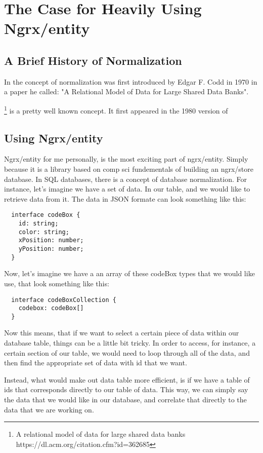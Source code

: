 \maketitle{}
\section{ The Case for Heavily Using Ngrx/entity }

\subsection{ A Brief History of Normalization}
In the concept of normalization was first introduced by Edgar F. Codd in 1970
in a paper he called: "A Relational Model of Data for Large Shared Data Banks".

\footnote{
A relational model of data for large shared data banks https://dl.acm.org/citation.cfm?id=362685}
is a pretty well known concept. It first
appeared in the 1980 version of

\subsection{Using Ngrx/entity}
Ngrx/entity for me personally, is the most exciting part of ngrx/entity. Simply
because it is a library based on comp sci fundementals of building an ngrx/store
database. In SQL databases, there is a concept of database normalization. For
instance, let's imagine we have a set of data. In our table, and we would like
to retrieve data from it. The data in JSON formate can look something like this:
\begin{lstlisting}
  interface codeBox {
    id: string;
    color: string;
    xPosition: number;
    yPosition: number;
  }
\end{lstlisting}

Now, let's imagine we have a an array of these codeBox types that we would like
use, that look something like this:
\begin{lstlisting}
  interface codeBoxCollection {
    codebox: codeBox[]
  }
\end{lstlisting}

Now this means, that if we want to select a certain piece of data within our
database table, things can be a little bit tricky. In order to access, for
instance, a certain section of our table, we would need to loop through all of
the data, and then find the appropriate set of data with id that we want.

Instead, what would make out data table more efficient, is if we have a table
of ids that corresponds directly to our table of data. This way, we can simply
say the data that we would like in our database, and correlate that directly to
the data that we are working on.

